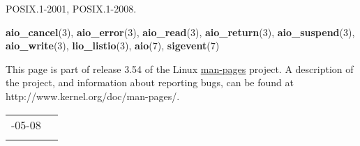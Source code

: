 \documentclass[]{article}
\let\realtextbf=\textbf
\renewcommand{\textbf}[1]{\textcolor{boldcolor}{\realtextbf{#1}}}
\renewcommand{\emph}[1]{\underline{#1}}
\begin{document}
POSIX.1-2001, POSIX.1-2008.


\textbf{aio\_cancel}(3), \textbf{aio\_error}(3), \textbf{aio\_read}(3),
\textbf{aio\_return}(3), \textbf{aio\_suspend}(3),
\textbf{aio\_write}(3), \textbf{lio\_listio}(3), \textbf{aio}(7),
\textbf{sigevent}(7)


This page is part of release 3.54 of the Linux \emph{man-pages} project.
A description of the project, and information about reporting bugs, can
be found at http://www.kernel.org/doc/man-pages/.

\begin{longtable}[c]{@{}ll@{}}
\toprule\addlinespace
2012-05-08 &
\\\addlinespace
\bottomrule
\end{longtable}
\end{document}
